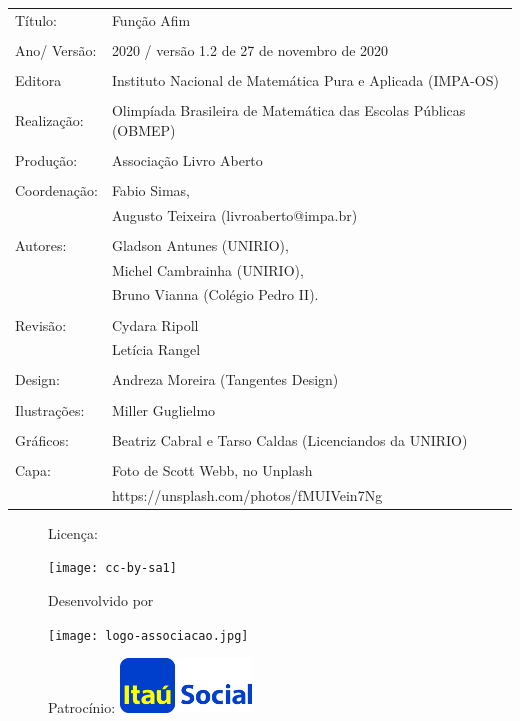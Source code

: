 \begin{tabular}{p{}p{}}
Título: & Função Afim\\
\\
Ano/ Versão: & 2020 / versão 1.2 de 27 de novembro de 2020\\
\\
Editora & Instituto Nacional de Matem\'atica Pura e Aplicada (IMPA-OS)\\
\\
Realização:& Olimp\'iada Brasileira de Matem\'atica das Escolas P\'ublicas (OBMEP)\\
\\
Produção:& Associação Livro Aberto\\
\\
Coordenação:& Fabio Simas, \\
            & Augusto Teixeira (livroaberto@impa.br)\\
\\
  Autores: & Gladson Antunes (UNIRIO),\\
        & Michel Cambrainha (UNIRIO),\\
             & Bruno Vianna (Colégio Pedro II).\\
\\
Revisão: &  Cydara Ripoll  \\
         &  Letícia Rangel \\
\\
Design: & Andreza Moreira (Tangentes Design) \\
\\
  Ilustrações: & Miller  Guglielmo \\ 
\\
Gráficos: & Beatriz Cabral e Tarso Caldas (Licenciandos da UNIRIO)\\
\\
  Capa: & Foto de Scott Webb, no Unplash \\
        & https://unsplash.com/photos/fMUIVein7Ng \\

\end{tabular}



\begin{figure}[b]
\begin{minipage}[l]{5cm}
\centering

{\large Licença:}

  \texttt{[image: cc-by-sa1]}
\end{minipage}\hfill
\begin{minipage}[c]{5cm}
\centering
{\large Desenvolvido por}

\texttt{[image: logo-associacao.jpg]}
\end{minipage}
\begin{minipage}[r]{5cm}
\centering

{\large Patrocínio:}
  \vspace{1em}
  \includegraphics[width=3.5cm]{itau}
\end{minipage}
\end{figure}


